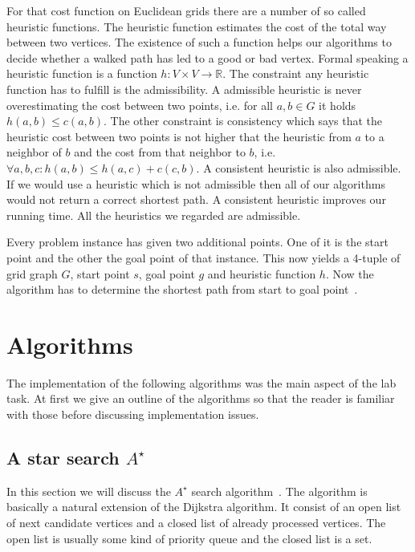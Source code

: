 \documentclass{article}
\begin{document}
    For that cost function on Euclidean grids there are a number of so called heuristic functions. The heuristic function estimates the cost of the total way between two vertices. The existence of such a function helps our algorithms to decide whether a walked path has led to a good or bad vertex. Formal speaking a heuristic function is a function $h : V \times V \rightarrow \mathbb{R}$. The constraint any heuristic function has to fulfill is the admissibility. A admissible heuristic is never overestimating the cost between two points, i.e. for all $a, b \in G$ it holds $h(a, b) \leq c(a,b)$. The other constraint is consistency which says that the heuristic cost between two points is not higher that the heuristic from $a$ to a neighbor of $b$ and the cost from that neighbor to $b$, i.e. $\forall a, b, c: h(a, b) \leq h(a, c) + c(c, b)$. A consistent heuristic is also admissible. If we would use a heuristic which is not admissible then all of our algorithms would not return a correct shortest path. A consistent heuristic improves our running time. All the heuristics we regarded are admissible.

    Every problem instance has given two additional points. One of it is the start point and the other the goal point of that instance. This now yields a 4-tuple of grid graph $G$, start point $s$, goal point $g$ and heuristic function $h$. Now the algorithm has to determine the shortest path from start to goal point~\cite{DBLP:conf/aaai/HaraborG11}.



    \section{Algorithms}
    \label{sec:algorithms}

    The implementation of the following algorithms was the main aspect of the lab task. At first we give an outline of the algorithms so that the reader is familiar with those before discussing implementation issues.

    \subsection{A star search $A^\star$ }

    In this section we will discuss the $A^\star$ search algorithm~\cite{Astar}. The algorithm is basically a natural extension of the Dijkstra algorithm. It consist of an open list of next candidate vertices and a closed list of already processed vertices. The open list is usually some kind of priority queue and the closed list is a set.
\end{document}
